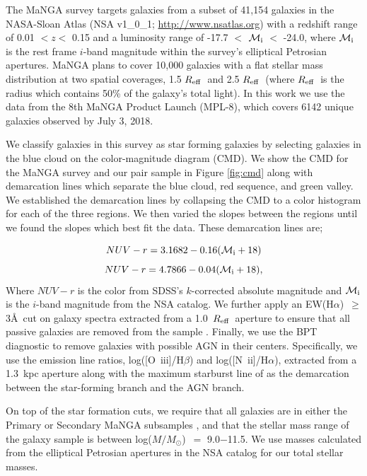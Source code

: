 \documentclass[iop,revtex4,twocolumn,apj,numberedappendix,appendixfloats]{emulateapj}
\newcommand{\reff}{$R_{\rm eff}$}
\newcommand{\ewha}{EW(H$\alpha$)}
\newcommand{\logm}{log($M/M_{\odot}$)}
\begin{document}
The MaNGA survey targets galaxies from a subset of 41,154 galaxies in the NASA-Sloan Atlas (NSA v1\_0\_1; \url{http://www.nsatlas.org}) with a redshift range of 0.01 $< z <$ 0.15 and a luminosity range of -17.7 $<$ $\mathcal{M}_{\rm i}$ $<$ -24.0, where $\mathcal{M}_{\rm i}$ is the rest frame $i$-band magnitude within the survey's elliptical Petrosian apertures. MaNGA plans to cover 10,000 galaxies with a flat stellar mass distribution at two spatial coverages, 1.5 \reff\ and 2.5 \reff\ (where \reff\ is the radius which contains 50\% of the galaxy's total light). In this work we use the data from the 8th MaNGA Product Launch (MPL-8), which covers 6142 unique galaxies observed by July 3, 2018. 

We classify galaxies in this survey as star forming galaxies by selecting galaxies in the blue cloud on the color-magnitude diagram (CMD). We show the CMD for the MaNGA survey and our pair sample in Figure \ref{fig:cmd} along with demarcation lines which separate the blue cloud, red sequence, and green valley. We established the demarcation lines by collapsing the CMD to a color histogram for each of the three regions. We then varied the slopes between the regions until we found the slopes which best fit the data. These demarcation lines are;

\begin{equation}\label{eq:blue}
NUV-r = 3.1682 - 0.16 (\mathcal{M}_{\rm i}+18)
\end{equation}
\begin{equation}\label{eq:red}
NUV-r = 4.7866 - 0.04 (\mathcal{M}_{\rm i}+18),
\end{equation}
Where $NUV-r$ is the color from SDSS's $k$-corrected absolute magnitude and $\mathcal{M}_{\rm i}$ is the $i$-band magnitude from the NSA catalog. We further apply an \ewha\ $\ge$ 3\AA\ cut on galaxy spectra extracted from a 1.0~\reff\ aperture to ensure that all passive galaxies are removed from the sample \citep{Cid-Fernandes:2011}. Finally, we use the BPT diagnostic \citep{Baldwin:1981} to remove galaxies with possible AGN in their centers. Specifically, we use the emission line ratios, log([O~{\sc iii}]/H$\beta$) and log([N~{\sc ii}]/H$\alpha$), extracted from a 1.3~kpc aperture along with the maximum starburst line of \citet{Kewley:2001} as the demarcation between the star-forming branch and the AGN branch.

On top of the star formation cuts, we require that all galaxies are in either the Primary or Secondary MaNGA subsamples \citep{Wake:2017}, and that the stellar mass range of the galaxy sample is between \logm\ $=$ 9.0$-$11.5. We use masses calculated from the elliptical Petrosian apertures in the NSA catalog for our total stellar masses. 
\end{document}
